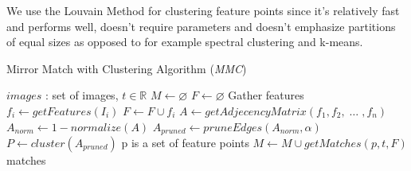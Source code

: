 \documentclass[12pt,journal]{IEEEtran}
\begin{document}
%

We use the Louvain Method\cite{blondel2008} for clustering feature 
points since it's relatively fast and performs 
well\cite{lancichinetti2009}, doesn't require 
parameters\cite{blondel2008} and doesn't emphasize partitions of equal 
sizes as opposed to for example spectral clustering and 
k-means\cite{von2007}.
%
\begin{algorithm}
\caption{Mirror Match with Clustering Algorithm (\emph{MMC})}
\label{alg-mmc}
{\fontsize{10}{10}\selectfont
\begin{algorithmic}
\Require $images$ : set of images, $t \in \mathbb{R}$
\State $M\gets \varnothing$
\State $F\gets \varnothing$
 \Comment Gather features
	\State $f_i\gets getFeatures(I_i)$
	\State $F\gets F \cup f_i$
\EndFor
\State $A\gets getAdjecencyMatrix(f_1, f_2,\; \ldots \;, f_n)$
\State $A_{norm}\gets 1 - normalize(A)$
\State $A_{pruned}\gets pruneEdges(A_{norm},\alpha)$
\State $P\gets cluster(A_{pruned})$
 \Comment p is a set of feature points
	\State $M\gets M \cup getMatches(p, t, F)$
\EndFor \\
\Return matches
\end{algorithmic}
}
\end{algorithm}
\end{document}
